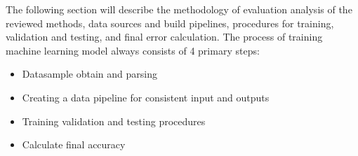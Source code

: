 The following section will describe the methodology of evaluation analysis of the reviewed methods, data sources and build pipelines, procedures for training, validation and testing, and final error calculation.
The process of training machine learning model always consists of 4 primary steps:
\begin{itemize}
    \item Datasample obtain and parsing\\
    \item Creating a data pipeline for consistent input and outputs\\
    \item Training validation and testing procedures\\
    \item Calculate final accuracy\\
\end{itemize}

